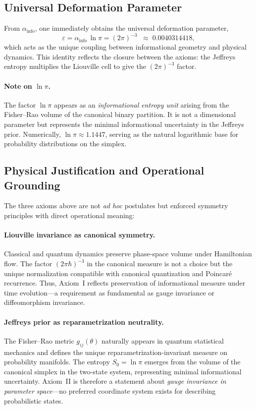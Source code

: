 \documentclass{article}
\numberwithin{equation}{section}
\theoremstyle{plain}
\theoremstyle{definition}
\theoremstyle{remark}
\newcommand{\ainfo}{\alpha_{\text{info}}}
\newcommand{\einfo}{\varepsilon}
\begin{document}
\subsection{Universal Deformation Parameter}
From $\ainfo$, one immediately obtains the universal deformation parameter,
\begin{equation}
\einfo = \ainfo \,\ln\pi = (2\pi)^{-3} \;\;\approx\; 0.0040314418,
\label{eq:epsilon_main}
\end{equation}
which acts as the unique coupling between informational geometry and physical dynamics. This identity reflects the closure between the axioms: the Jeffreys entropy multiplies the Liouville cell to give the $(2\pi)^{-3}$ factor.

\paragraph{Note on $\ln \pi$.}
The factor $\ln \pi$ appears as an \emph{informational entropy unit} arising from the Fisher–Rao volume of the canonical binary partition. It is not a dimensional parameter but represents the minimal informational uncertainty in the Jeffreys prior. Numerically, $\ln \pi \approx 1.1447$, serving as the natural logarithmic base for probability distributions on the simplex.

\subsection{Physical Justification and Operational Grounding}
\label{subsec:physical_justification}

The three axioms above are not \emph{ad hoc} postulates but enforced symmetry principles with direct operational meaning:

\paragraph{Liouville invariance as canonical symmetry.}
Classical and quantum dynamics preserve phase-space volume under Hamiltonian flow. The factor $(2\pi\hbar)^{-3}$ in the canonical measure is not a choice but the unique normalization compatible with canonical quantization and Poincaré recurrence. Thus, Axiom~I reflects preservation of informational measure under time evolution—a requirement as fundamental as gauge invariance or diffeomorphism invariance.

\paragraph{Jeffreys prior as reparametrization neutrality.}
The Fisher--Rao metric $g_{ij}(\theta)$ naturally appears in quantum statistical mechanics \cite{Amari1985,Cencov1982} and defines the unique reparametrization-invariant measure on probability manifolds. The entropy $S_0 = \ln\pi$ emerges from the volume of the canonical simplex in the two-state system, representing minimal informational uncertainty. Axiom~II is therefore a statement about \emph{gauge invariance in parameter space}—no preferred coordinate system exists for describing probabilistic states.
\end{document}
